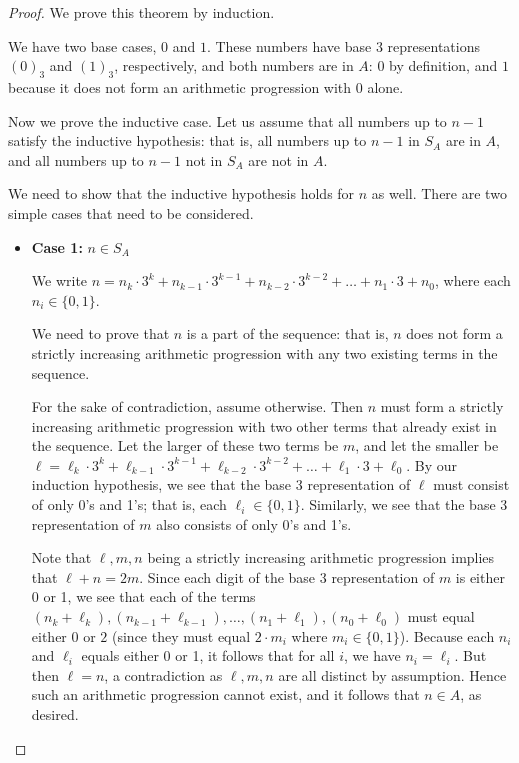\documentclass[11pt,letterpaper,twoside,english]{article}
\theoremstyle{theorem}
\theoremstyle{remark}
\begin{document}
\begin{proof}
We prove this theorem by induction.

We have two base cases, $0$ and $1$. These numbers have base $3$ representations $(0)_3$ and $(1)_3$, respectively, and both numbers are in $A$: $0$ by definition, and $1$ because it does not form an arithmetic progression with $0$ alone.

Now we prove the inductive case. Let us assume that all numbers up to $n-1$ satisfy the inductive hypothesis: that is, all numbers up to $n-1$ in $S_A$ are in $A$, and all numbers up to $n-1$ not in $S_A$ are {not} in $A$.

We need to show that the inductive hypothesis holds for $n$ as well. There are two simple cases that need to be considered.

\begin{itemize}

\item \textbf{Case 1:} $n \in S_A$

We write $n = n_k \cdot 3^k + n_{k-1} \cdot 3^{k-1} + n_{k-2} \cdot 3^{k-2} + \ldots + n_1 \cdot 3 + n_0$, where each $n_i \in \{0, 1\}$. 

We need to prove that $n$ is a part of the sequence: that is, $n$ does not form a strictly increasing arithmetic progression with any two existing terms in the sequence. 

For the sake of contradiction, assume otherwise. Then $n$ must form a strictly increasing arithmetic progression with two other terms that already exist in the sequence. Let the larger of these two terms be $m$, and let the smaller be $\ell = \ell_k \cdot 3^k + \ell_{k-1} \cdot 3^{k-1} + \ell_{k-2} \cdot 3^{k-2} + \ldots + \ell_1 \cdot 3 + \ell_0$. By our induction hypothesis, we see that the base 3 representation of $\ell$ must consist of only 0's and 1's; that is, each $\ell_i\in\{0,1\}$. Similarly, we see that the base 3 representation of $m$ also consists of only 0's and 1's.

Note that $\ell, m, n$ being a strictly increasing arithmetic progression implies that $\ell+n=2m$. Since each digit of the base 3 representation of $m$ is either 0 or 1, we see that each of the terms $(n_k + \ell_k), (n_{k-1} + \ell_{k-1}), \ldots, (n_1 + \ell_1), (n_0 + \ell_0)$ must equal either $0$ or $2$ (since they must equal $2 \cdot m_i$ where $m_i \in \{0, 1\}$). Because each $n_i$ and $\ell_i$ equals either 0 or 1, it follows that for all $i$, we have $n_i=\ell_i$. But then $\ell=n$, a contradiction as $\ell, m, n$ are all distinct by assumption. Hence such an arithmetic progression cannot exist, and it follows that $n\in A$, as desired.
\end{itemize}


\end{proof}
\end{document}
